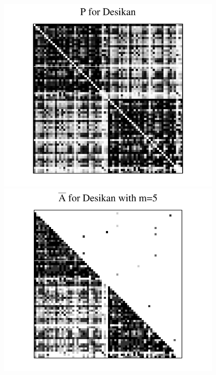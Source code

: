 \begin{figure}
\centering
\includegraphics[height=.2\textheight]{./Figures/P_desikan.pdf} \hspace{-35pt}
\includegraphics[height=.201\textheight]{./Figures/Abar_desikan_m5.pdf} \hspace{-35pt}

\end{figure}
